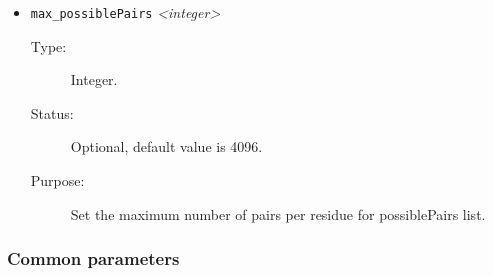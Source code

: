 \documentclass[a4paper]{article}
\begin{document}
\begin{itemize}
\item \texttt{max\_possiblePairs} \textit{\textless integer\textgreater}
\begin{description}
\item[Type:] Integer.
\item[Status:] Optional, default value is 4096.
\item[Purpose:] Set the maximum number of pairs per residue for possiblePairs list.
\end{description}

\end{itemize}

\subsubsection{Common parameters}
\label{sec:par.common}
\end{document}
